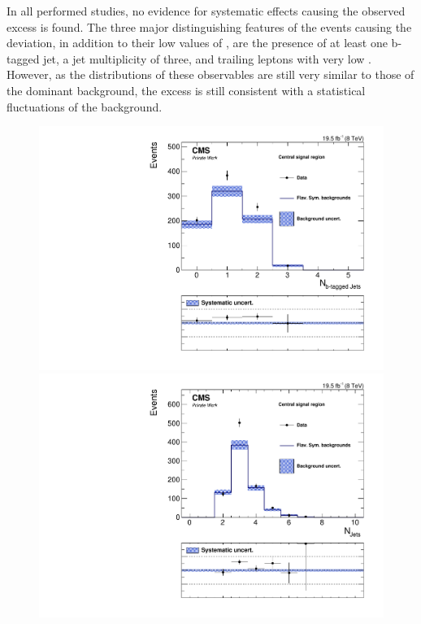 In all performed studies, no evidence for systematic effects causing the observed excess is found. The three major distinguishing features of the events causing the deviation, in addition to their low values of \mll, are the presence of at least one b-tagged jet, a jet multiplicity of three, and trailing leptons with very low \pt. However, as the distributions of these observables are still very similar to those of the dominant \ttbar background, the excess is still consistent with a statistical fluctuations of the background. 

\begin{figure}[htbp]
\centering
\begin{minipage}[t]{0.49\textwidth}
  \includegraphics[width=\textwidth]{plots/results/rSFOFDependencies/rSFOFDependency_SignalCentral_NBJets_Full2012_SF_lowMass.pdf}
\end{minipage}
\begin{minipage}[t]{0.49\textwidth}
\includegraphics[width=\textwidth]{plots/results/rSFOFDependencies/rSFOFDependency_SignalCentral_NJets_Full2012_SF_lowMass.pdf}

\end{minipage}
\end{figure}
